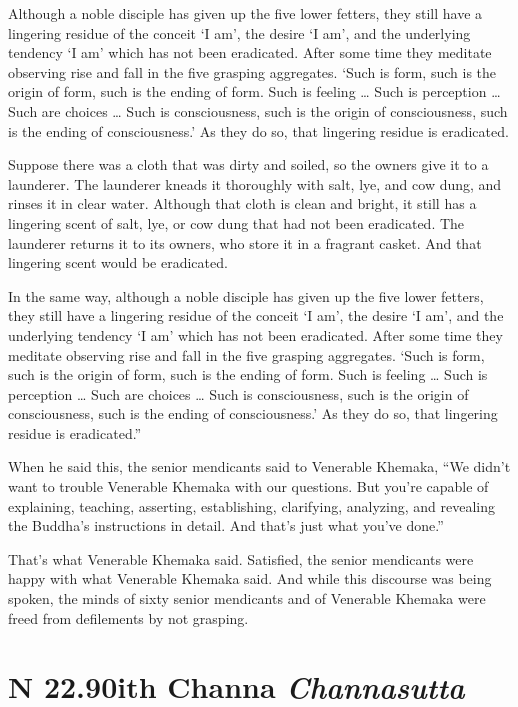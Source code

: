 \documentclass[12pt,openany]{book}%
\newcommand*{\suttatitleacronym}[1]{\smaller[2]{#1}\vspace*{.3em}}
\newcommand*{\suttatitletranslation}[1]{\linebreak{#1}}
\newcommand*{\suttatitleroot}[1]{\linebreak\smaller[2]\itshape{#1}}
\newcommand*{\tocacronym}[1]{\hspace*{-3.3em}{#1}\quad}
\newcommand*{\toctranslation}[1]{#1}
\newcommand*{\tocroot}[1]{(\textit{#1})}
\begin{document}
Although a noble disciple has given up the five lower fetters, they still have a lingering residue of the conceit ‘I am’, the desire ‘I am’, and the underlying tendency ‘I am’ which has not been eradicated. After some time they meditate observing rise and fall in the five grasping aggregates. ‘Such is form, such is the origin of form, such is the ending of form. Such is feeling … Such is perception … Such are choices … Such is consciousness, such is the origin of consciousness, such is the ending of consciousness.’ As they do so, that lingering residue is eradicated. 

Suppose there was a cloth that was dirty and soiled, so the owners give it to a launderer. The launderer kneads it thoroughly with salt, lye, and cow dung, and rinses it in clear water. Although that cloth is clean and bright, it still has a lingering scent of salt, lye, or cow dung that had not been eradicated. The launderer returns it to its owners, who store it in a fragrant casket. And that lingering scent would be eradicated. 

In the same way, although a noble disciple has given up the five lower fetters, they still have a lingering residue of the conceit ‘I am’, the desire ‘I am’, and the underlying tendency ‘I am’ which has not been eradicated. After some time they meditate observing rise and fall in the five grasping aggregates. ‘Such is form, such is the origin of form, such is the ending of form. Such is feeling … Such is perception … Such are choices … Such is consciousness, such is the origin of consciousness, such is the ending of consciousness.’ As they do so, that lingering residue is eradicated.” 

When he said this, the senior mendicants said to Venerable Khemaka, “We didn’t want to trouble Venerable Khemaka with our questions. But you’re capable of explaining, teaching, asserting, establishing, clarifying, analyzing, and revealing the Buddha’s instructions in detail. And that’s just what you’ve done.” 

That’s what Venerable Khemaka said. Satisfied, the senior mendicants were happy with what Venerable Khemaka said. And while this discourse was being spoken, the minds of sixty senior mendicants and of Venerable Khemaka were freed from defilements by not grasping. 

%
\section*{{\suttatitleacronym SN 22.90}{\suttatitletranslation With Channa }{\suttatitleroot Channasutta}}
\addcontentsline{toc}{section}{\tocacronym{SN 22.90} \toctranslation{With Channa } \tocroot{Channasutta}}
\end{document}

